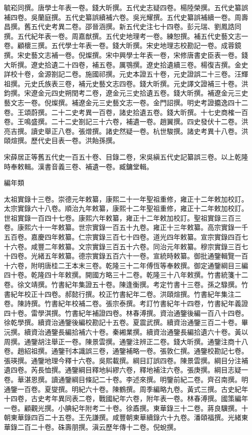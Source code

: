 \begin{pinyinscope}
毓崧同撰。唐學士年表一卷。錢大昕撰。五代史志疑四卷。楊陸榮撰。五代史纂誤補四卷。吳蘭庭撰。五代史纂誤續補六卷。吳光耀撰。五代史纂誤補續一卷。周壽昌撰。舊五代史考異二卷。邵晉涵撰。新五代史注七十四卷。彭元瑞、劉鳳誥同撰。五代紀年表一卷。周嘉猷撰。五代史地理考一卷。練恕撰。補五代史藝文志一卷。顧櫰三撰。五代學士年表一卷。錢大昕撰。宋史地理志校勘記一卷。成蓉鏡撰。宋史藝文志補一卷。倪燦撰。宋中興學士年表一卷，宋修唐書史臣表一卷。錢大昕撰。遼史拾遺二十四卷，補五卷。厲鶚撰。遼史拾遺續三卷。楊復吉撰。金史詳校十卷，金源劄記二卷。施國祁撰。元史本證五十卷，元史證誤二十三卷。汪輝祖撰。元史氏族表三卷，補元史藝文志四卷。錢大昕撰。元史譯文證補三十卷。洪鈞撰。宋遼金元四史朔閏考二卷，遼金元三史拾遺五卷。錢大昕撰。補遼金元三史藝文志一卷。倪燦撰。補遼金元三史藝文志一卷。金門詔撰。明史考證攟逸四十二卷。王頌蔚撰。二十二史考異一百卷，諸史拾遺五卷。錢大昕撰。十七史商榷一百卷。王鳴盛撰。二十二史劄記三十六卷，補遺一卷。趙翼撰。四史發伏十二卷。洪亮吉撰。讀史舉正八卷。張熷撰。諸史然疑一卷。杭世駿撰。諸史考異十八卷。洪頤煊撰。歷代史目表一卷。洪飴孫撰。

宋薛居正等舊五代史一百五十卷、目錄二卷，宋吳縝五代史記纂誤三卷。以上乾隆時奉敕輯。漢書音義三卷、補遺一卷。臧鏞堂輯。

編年類

太祖實錄十三卷。崇德元年敕纂，康熙二十一年聖祖重修，雍正十二年敕加校訂。太宗實錄六十八卷。順治九年敕纂，康熙十二年聖祖重修，雍正十二年敕加校訂。世祖實錄一百四十七卷。康熙六年敕纂，雍正十二年敕加校訂。聖祖實錄三百三卷。康熙六十一年敕纂。世宗實錄一百五十九卷。雍正十三年敕纂。高宗實錄一千五百卷。嘉慶四年敕纂。仁宗實錄三百七十四卷。道光四年敕纂。宣宗實錄四百七十六卷。咸豐二年敕纂。文宗實錄三百五十六卷。同治元年敕纂。穆宗實錄三百七十四卷。光緒五年敕纂。德宗實錄五百六十一卷。宣統時敕纂。御批通鑒輯覽一百十六卷，附明唐桂二王本末三卷。乾隆三十二年傅恆等奉敕撰。御定通鑒綱目三編四十卷。乾隆四十年敕撰。開國方略三十二卷。乾隆三十八年敕撰。竹書統箋十二卷。徐文靖撰。竹書紀年集證五十卷。陳逢衡撰。考定竹書十三卷。孫之騄撰。竹書紀年校正十四卷。郝懿行撰。校正竹書紀年二卷。洪頤煊撰。竹書紀年集注二卷。陳詩撰。竹書紀年校補二卷。張宗泰撰。考訂竹書紀年十四卷，竹書紀年義證四十卷。雷學淇撰。竹書紀年補證四卷。林春溥撰。資治通鑒後編一百八十四卷。徐乾學撰。續資治通鑒後編校勘記十五卷。夏震武撰。續資治通鑒三百二十卷。畢沅撰。續資治通鑒長編拾補六十卷。秦緗業撰。續資治通鑒長編拾遺六十卷。黃以周撰。通鑒胡注舉正一卷。陳景雲撰。通鑒注辨正二卷。錢大昕撰。通鑒注商十八卷。趙紹祖撰。通鑒刊本識誤三卷，通鑒補略一卷。張敦仁撰。通鑒校勘記七卷。張瑛撰。通鑒地理今釋十六卷。吳熙載撰。綱目訂誤四卷。陳景雲撰。綱目分注補遺四卷。芮長恤撰。通鑒綱目釋地糾繆六卷，釋地補注六卷。張庚撰。綱目志疑一卷。華湛恩撰。讀通鑒綱目條記二十卷。李述來撰。明鑒前紀二卷。齊召南撰。明通鑒一百卷。夏燮撰。明紀六十卷。陳鶴撰。周季編略九卷。黃式三撰。古史紀年十四卷，古史考年異同表二卷，戰國紀年六卷，附年表一卷。林春溥撰。國策編年一卷。顧觀光撰。小腆紀年附考二十卷。徐鼒撰。東華錄三十二卷。蔣良驥撰。十朝東華錄四百二十五卷。王先謙撰。咸豐朝東華續錄六十九卷。潘頤福撰。光緒東華錄二百二十卷。硃壽朋撰。滇云歷年傳十二卷。倪蛻撰。


\end{pinyinscope}

